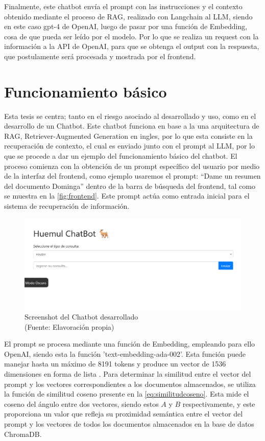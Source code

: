 Finalmente, este chatbot envía el prompt con las instrucciones y el contexto obtenido mediante el proceso de RAG, realizado con 
Langchain al LLM, siendo en este caso gpt-4 de OpenAI, luego de pasar por una función de Embedding, cosa de que 
pueda ser leído por el modelo. Por lo que se realiza un request con la información a la API de OpenAI, para que se 
obtenga el output con la respuesta, que postulamente será procesada y mostrada por el frontend.

\newpage

\section{Funcionamiento básico}

Esta tesis se centra; tanto en el riesgo asociado al desarrollado y uso, como en el desarrollo de un Chatbot. Este chatbot funciona 
en base a la una arquitectura de RAG, Retriever-Augmented Generation en ingles, por lo que esta consiste en 
la recuperación de contexto, el cual es enviado junto con el prompt al LLM, por lo que se procede a dar un ejemplo del funcionamiento básico del chatbot. El proceso comienza con 
la obtención de un prompt específico del usuario por medio de la interfaz del frontend, como ejemplo usaremos el prompt: ``Dame un resumen del documento Dominga'' 
dentro de la barra de búsqueda del frontend, tal como se muestra en la \autoref{fig:frontend}. Este prompt actúa como entrada inicial para el sistema de recuperación de información.

\begin{figure}[ht!]
    \centering
    \includegraphics[width=.9\textwidth]{figures/website.png}
    \caption[Screenshot del Chatbot desarrollado]{Screenshot del Chatbot desarrollado\\
    {\scriptsize (Fuente: Elavoración propia)}}
    \label{fig:frontend}
\end{figure}

El prompt se procesa mediante una función de Embedding, empleando para ello OpenAI, siendo esta  
la función 'text-embedding-ada-002'. Esta función puede manejar hasta un máximo de 8191 tokens y 
produce un vector de 1536 dimensiones en forma de lista \cite{openai1}. Para determinar la similitud entre el 
vector del prompt y los vectores correspondientes a los documentos almacenados, se utiliza la función 
de similitud coseno presente en la \autoref{eq:similitudcoseno}. Esta mide el coseno del ángulo entre dos vectores,
siendo estos $A$ y $B$ respectivamente, y este proporciona un valor que refleja su proximidad semántica entre el vector
del prompt y los vectores de todos los documentos almacenados en la base de datos ChromaDB.

